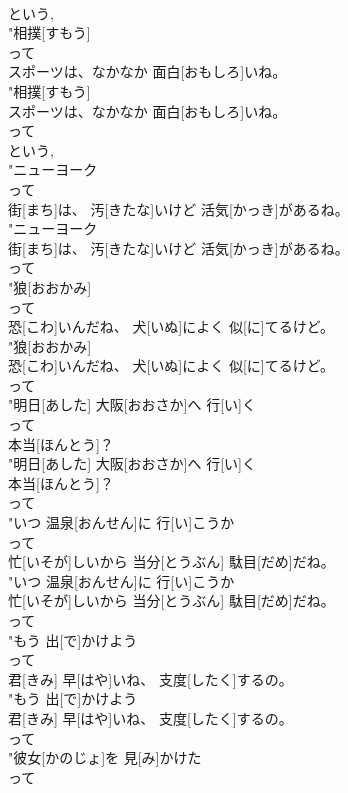 \documentclass[8pt]{extreport}
\begin{document}
\begin{CJK}{UTF8}{min}
\\	という, 
\\	"相撲[すもう]
\\	って
\\	スポーツは、なかなか 面白[おもしろ]いね。
\\	"相撲[すもう]
\\	スポーツは、なかなか 面白[おもしろ]いね。
\\	って
\\	という, 
\\	"ニューヨーク
\\	って
\\	街[まち]は、 汚[きたな]いけど 活気[かっき]があるね。
\\	"ニューヨーク
\\	街[まち]は、 汚[きたな]いけど 活気[かっき]があるね。
\\	って
\\	"狼[おおかみ]
\\	って
\\	恐[こわ]いんだね、 犬[いぬ]によく 似[に]てるけど。
\\	"狼[おおかみ]
\\	恐[こわ]いんだね、 犬[いぬ]によく 似[に]てるけど。
\\	って
\\	"明日[あした] 大阪[おおさか]へ 行[い]く
\\	って
\\	本当[ほんとう]？
\\	"明日[あした] 大阪[おおさか]へ 行[い]く
\\	本当[ほんとう]？
\\	って
\\	"いつ 温泉[おんせん]に 行[い]こうか
\\	って
\\	忙[いそが]しいから 当分[とうぶん] 駄目[だめ]だね。
\\	"いつ 温泉[おんせん]に 行[い]こうか
\\	忙[いそが]しいから 当分[とうぶん] 駄目[だめ]だね。
\\	って
\\	"もう 出[で]かけよう
\\	って
\\	君[きみ] 早[はや]いね、 支度[したく]するの。
\\	"もう 出[で]かけよう
\\	君[きみ] 早[はや]いね、 支度[したく]するの。
\\	って
\\	"彼女[かのじょ]を 見[み]かけた
\\	って

\end{CJK}
\end{document}
